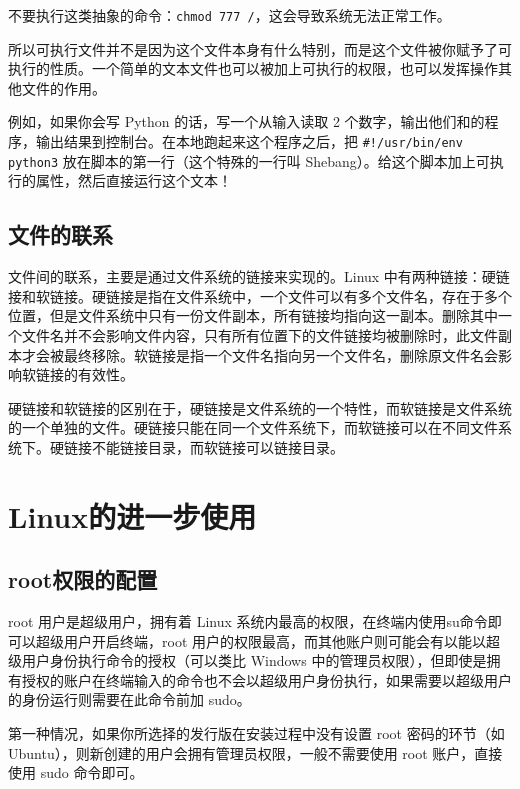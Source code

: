 \documentclass[../main.tex]{subfiles}
\begin{document}
\begin{warning}
  不要执行这类抽象的命令：\texttt{chmod 777 /}，这会导致系统无法正常工作。
\end{warning}

所以可执行文件并不是因为这个文件本身有什么特别，而是这个文件被你赋予了可执行的性质。一个简单的文本文件也可以被加上可执行的权限，也可以发挥操作其他文件的作用。

例如，如果你会写 Python 的话，写一个从输入读取 2 个数字，输出他们和的程序，输出结果到控制台。在本地跑起来这个程序之后，把 \texttt{\#!/usr/bin/env python3} 放在脚本的第一行（这个特殊的一行叫 Shebang）。给这个脚本加上可执行的属性，然后直接运行这个文本！

\subsection{文件的联系}

文件间的联系，主要是通过文件系统的链接来实现的。Linux 中有两种链接：硬链接和软链接。硬链接是指在文件系统中，一个文件可以有多个文件名，存在于多个位置，但是文件系统中只有一份文件副本，所有链接均指向这一副本。删除其中一个文件名并不会影响文件内容，只有所有位置下的文件链接均被删除时，此文件副本才会被最终移除。软链接是指一个文件名指向另一个文件名，删除原文件名会影响软链接的有效性。

硬链接和软链接的区别在于，硬链接是文件系统的一个特性，而软链接是文件系统的一个单独的文件。硬链接只能在同一个文件系统下，而软链接可以在不同文件系统下。硬链接不能链接目录，而软链接可以链接目录。

\section{Linux的进一步使用}

\subsection{root权限的配置}

root 用户是超级用户，拥有着 Linux 系统内最高的权限，在终端内使用su命令即可以超级用户开启终端，root 用户的权限最高，而其他账户则可能会有以能以超级用户身份执行命令的授权（可以类比 Windows 中的管理员权限），但即使是拥有授权的账户在终端输入的命令也不会以超级用户身份执行，如果需要以超级用户的身份运行则需要在此命令前加 sudo。

第一种情况，如果你所选择的发行版在安装过程中没有设置 root 密码的环节（如 Ubuntu），则新创建的用户会拥有管理员权限，一般不需要使用 root 账户，直接使用 sudo 命令即可。
\end{document}
